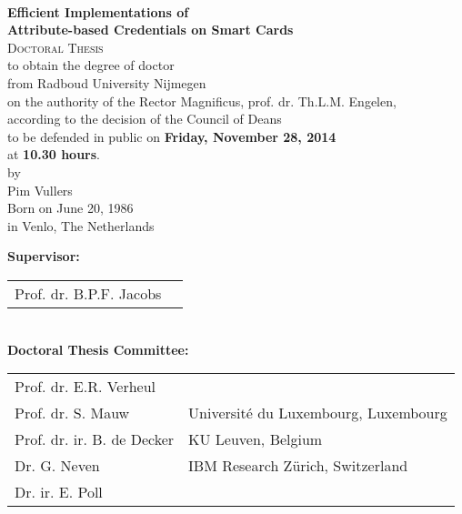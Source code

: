 \thispagestyle{empty}

\begin{center}
  ~ \\[25mm]

  \textbf{\Large Efficient Implementations of\\ Attribute-based Credentials on Smart Cards}\\[20mm]

  \textsc{Doctoral Thesis} \\[15mm]

  to obtain the degree of doctor \\
  from Radboud University Nijmegen \\
  on the authority of the Rector Magnificus, prof. dr. Th.L.M. Engelen, \\
  according to the decision of the Council of Deans \\
  to be defended in public on \textbf{Friday, November 28, 2014} \\
  at \textbf{10.30 hours}. \\[20mm]

  by \\[20mm]

  Pim Vullers \\[15mm]

  Born on June 20, 1986 \\
  in Venlo, The Netherlands
\end{center}

\clearpage

\thispagestyle{empty}

\noindent\textbf{Supervisor:} \\[2mm]
\indent\begin{tabular}{p{40mm}l}
  Prof. dr. B.P.F. Jacobs & \\
\end{tabular} \\[2mm]

\noindent\textbf{Doctoral Thesis Committee:} \\[2mm]
\indent\begin{tabular}{p{40mm}l}
  Prof. dr. E.R. Verheul     & \\
  Prof. dr. S. Mauw          & Universit\'{e} du Luxembourg, Luxembourg \\
  Prof. dr. ir. B. de Decker & KU Leuven, Belgium \\
  Dr. G. Neven               & IBM Research Z\"{u}rich, Switzerland \\
  Dr. ir. E. Poll            & \\
\end{tabular}
